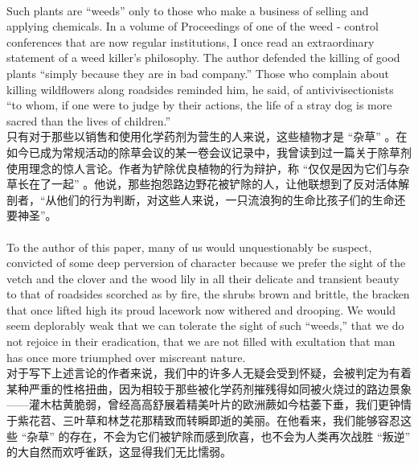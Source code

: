 \documentclass{article}
\begin{document}
\\
Such plants are “weeds” only to those who make a business of selling and applying chemicals. In a volume of Proceedings of one of the weed - control conferences that are now regular institutions, I once read an extraordinary statement of a weed killer’s philosophy. The author defended the killing of good plants “simply because they are in bad company.” Those who complain about killing wildflowers along roadsides reminded him, he said, of antivivisectionists “to whom, if one were to judge by their actions, the life of a stray dog is more sacred than the lives of children.”\\
只有对于那些以销售和使用化学药剂为营生的人来说，这些植物才是 “杂草” 。在如今已成为常规活动的除草会议的某一卷会议记录中，我曾读到过一篇关于除草剂使用理念的惊人言论。作者为铲除优良植物的行为辩护，称 “仅仅是因为它们与杂草长在了一起” 。他说，那些抱怨路边野花被铲除的人，让他联想到了反对活体解剖者，“从他们的行为判断，对这些人来说，一只流浪狗的生命比孩子们的生命还要神圣”。 \\

\\
To the author of this paper, many of us would unquestionably be suspect, convicted of some deep perversion of character because we prefer the sight of the vetch and the clover and the wood lily in all their delicate and transient beauty to that of roadsides scorched as by fire, the shrubs brown and brittle, the bracken that once lifted high its proud lacework now withered and drooping. We would seem deplorably weak that we can tolerate the sight of such “weeds,” that we do not rejoice in their eradication, that we are not filled with exultation that man has once more triumphed over miscreant nature.\\
对于写下上述言论的作者来说，我们中的许多人无疑会受到怀疑，会被判定为有着某种严重的性格扭曲，因为相较于那些被化学药剂摧残得如同被火烧过的路边景象——灌木枯黄脆弱，曾经高高舒展着精美叶片的欧洲蕨如今枯萎下垂，我们更钟情于紫花苕、三叶草和林芝花那精致而转瞬即逝的美丽。在他看来，我们能够容忍这些 “杂草” 的存在，不会为它们被铲除而感到欣喜，也不会为人类再次战胜 “叛逆” 的大自然而欢呼雀跃，这显得我们无比懦弱。 \\
\end{document}
